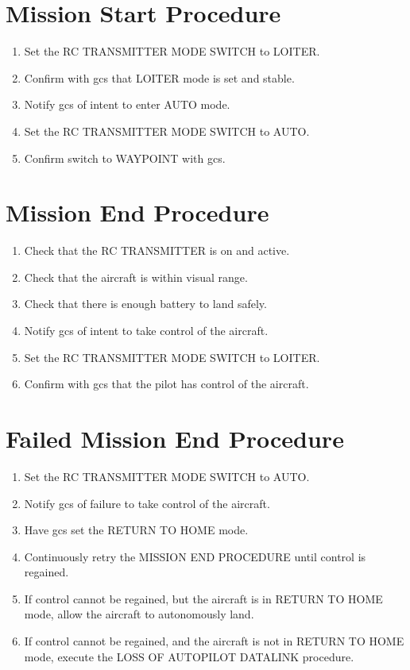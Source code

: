 \documentclass{report}
\begin{document}
	\section{Mission Start Procedure}
		\begin{enumerate}
			\item Set the RC TRANSMITTER MODE SWITCH to LOITER.
			\item Confirm with \gls{gcs} that LOITER mode is set and stable.
			\item Notify \gls{gcs} of intent to enter AUTO mode.
			\item Set the RC TRANSMITTER MODE SWITCH to AUTO.
			\item Confirm switch to WAYPOINT with \gls{gcs}.
		\end{enumerate}
	\section{Mission End Procedure}
		\begin{enumerate}
			\item Check that the RC TRANSMITTER is on and active.
			\item Check that the aircraft is within visual range.
			\item Check that there is enough battery to land safely.
			\item Notify \gls{gcs} of intent to take control of the aircraft.
			\item Set the RC TRANSMITTER MODE SWITCH to LOITER.
			\item Confirm with \gls{gcs} that the pilot has control of the aircraft.
		\end{enumerate}
	\section{Failed Mission End Procedure}
		\begin{enumerate}
			\item Set the RC TRANSMITTER MODE SWITCH to AUTO.
			\item Notify \gls{gcs} of failure to take control of the aircraft.
			\item Have \gls{gcs} set the RETURN TO HOME mode.
			\item Continuously retry the MISSION END PROCEDURE until control is regained.
			\item If control cannot be regained, but the aircraft is in RETURN TO HOME mode, allow the aircraft to autonomously land.
			\item If control cannot be regained, and the aircraft is not in RETURN TO HOME mode, execute the LOSS OF AUTOPILOT DATALINK procedure.
		\end{enumerate}
\end{document}
